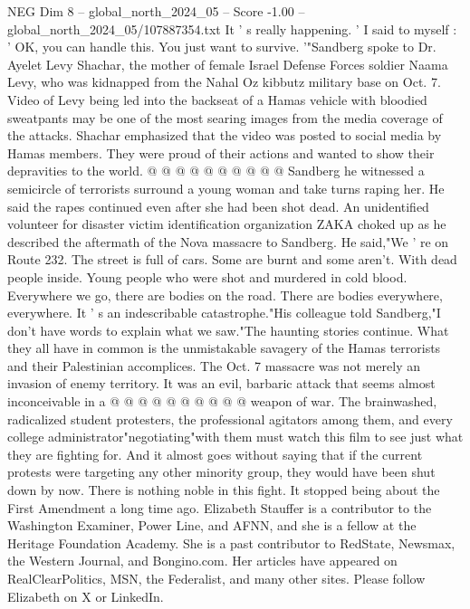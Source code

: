 \begin{textsample}{NEG Dim 8 – global\_north\_2024\_05 – Score -1.00 – global\_north\_2024\_05/107887354.txt}
It ' s really happening. ' I said to myself : ' OK, you can handle this.
You just want to survive. '"Sandberg spoke to Dr.
Ayelet Levy Shachar, the mother of female Israel Defense Forces soldier Naama Levy, who was kidnapped from the Nahal Oz kibbutz military base on Oct. 7.
Video of Levy being led into the backseat of a Hamas vehicle with bloodied sweatpants may be one of the most searing images from the media coverage of the attacks.
Shachar emphasized that the video was posted to social media by Hamas members.
They were proud of their actions and wanted to show their depravities to the world. @ @ @ @ @ @ @ @ @ @ Sandberg he witnessed a semicircle of terrorists surround a young woman and take turns raping her.
He said the rapes continued even after she had been shot dead.
An unidentified volunteer for disaster victim identification organization ZAKA choked up as he described the aftermath of the Nova massacre to Sandberg.
He said,"We ' re on Route 232.
The street is full of cars.
Some are burnt and some aren't.
With dead people inside.
Young people who were shot and murdered in cold blood.
Everywhere we go, there are bodies on the road.
There are bodies everywhere, everywhere.
It ' s an indescribable catastrophe."His colleague told Sandberg,"I don't have words to explain what we saw."The haunting stories continue.
What they all have in common is the unmistakable savagery of the Hamas terrorists and their Palestinian accomplices.
The Oct. 7 massacre was not merely an invasion of enemy territory.
It was an evil, barbaric attack that seems almost inconceivable in a @ @ @ @ @ @ @ @ @ @ weapon of war.
The brainwashed, radicalized student protesters, the professional agitators among them, and every college administrator"negotiating"with them must watch this film to see just what they are fighting for.
And it almost goes without saying that if the current protests were targeting any other minority group, they would have been shut down by now.
There is nothing noble in this fight.
It stopped being about the First Amendment a long time ago.
Elizabeth Stauffer is a contributor to the Washington Examiner, Power Line, and AFNN, and she is a fellow at the Heritage Foundation Academy.
She is a past contributor to RedState, Newsmax, the Western Journal, and Bongino.com.
Her articles have appeared on RealClearPolitics, MSN, the Federalist, and many other sites.
Please follow Elizabeth on X or LinkedIn.

\end{textsample}
